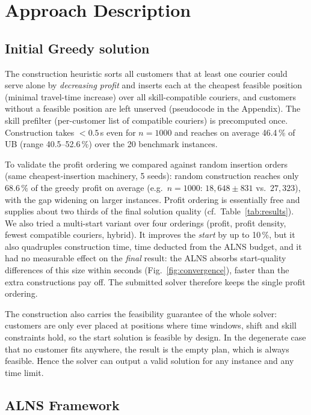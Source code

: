 \documentclass[10pt, a4paper]{article}
\begin{document}
\section{Approach Description}
\subsection{Initial Greedy solution}

The construction heuristic sorts all customers that at least one courier
could serve alone by \emph{decreasing profit} and inserts each at the
cheapest feasible position (minimal travel-time increase) over all
skill-compatible couriers, and customers without a feasible position are left
unserved (pseudocode in the Appendix). The skill prefilter (per-customer
list of compatible couriers) is
precomputed once. Construction takes $<0.5$\,s even for $n=1000$ and reaches
on average 46.4\,\% of UB (range 40.5--52.6\,\%) over the 20 benchmark
instances.

To validate the profit ordering we compared against random insertion orders
(same cheapest-insertion machinery, 5 seeds): random construction reaches
only $68.6\,\%$ of the greedy profit on average (e.g.\ $n{=}1000$:
$18{,}648 \pm 831$ vs.\ $27{,}323$), with the gap widening on larger
instances. Profit ordering is essentially free and supplies about two thirds
of the final solution quality (cf.\ Table~\ref{tab:results}). We also tried
a multi-start variant over four orderings (profit, profit density, fewest
compatible couriers, hybrid). It improves the \emph{start} by up to 10\,\%,
but it also quadruples construction time, time deducted from the ALNS
budget, and it had no measurable effect on the \emph{final} result: the
ALNS absorbs start-quality differences of this size within seconds
(Fig.~\ref{fig:convergence}), faster than the extra constructions pay off.
The submitted solver therefore keeps the single profit ordering.

The construction also carries the feasibility guarantee of the whole solver:
customers are only ever placed at positions where time windows, shift and
skill constraints hold, so the start solution is feasible by design. In the
degenerate case that no customer fits anywhere, the result is the empty
plan, which is always feasible. Hence the solver can output a valid solution
for any instance and any time limit.

\subsection{ALNS Framework}
\end{document}
